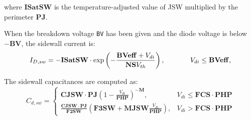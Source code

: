 where $\mathbf{ISatSW}$ is the temperature-adjusted value of JSW multiplied
by the perimeter $\mathbf{PJ}$.

When the breakdown voltage \texttt{BV} has been given and the diode voltage is below $-\mathbf{BV}$, the sidewall current is:
\[
I_{D,sw} = -\mathbf{ISatSW}\cdot\exp \left(-\frac{\mathbf{BVeff} + V_{di}}{\mathbf{NS}V_{th}}
\right), \hspace*{0.5in} V_{di} \leq \mathbf{BVeff},
\]

The sidewall capacitances are computed as:
\[
C_{d,sw} = \left\{ \begin{array}{ll}
\mathbf{CJSW}\cdot\mathbf{PJ} \left(1-\frac{V_{di}}{\mathbf{PHP}} \right)^{-\mathbf{M}}, &
V_{di} \leq \mathbf{FCS \cdot PHP} \\
\frac{\mathbf{CJSW}\cdot\mathbf{PJ}}{\mathbf{F2SW}}\left(\mathbf{F3SW}+\mathbf{MJSW}\frac{V_{di}}{\mathbf{PHP}}\right),
& V_{di} > \mathbf{FCS \cdot PHP}
\end{array}
\right.
\]


